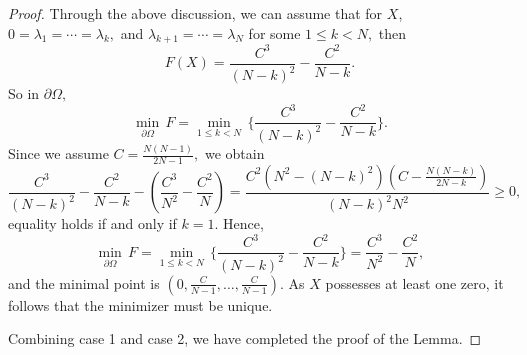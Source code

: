 \documentclass[10pt,a4paper]{amsart}
\begin{document}
\begin{proof}
		Through the above discussion, we can assume that for $X$, $0={\lambda }_1=\cdots ={\lambda }_k,$ and ${\lambda }_{k+1}=\cdots ={\lambda }_N$ for some $1\le k< N,$ then
		\[F(X)=\frac{C^3}{(N-k)^2}-\frac{C^2}{N-k}.\]
		So in $\partial \Omega,$
		$$\underset{\partial \Omega }{\mathop{\min }}\,F=\underset{1\le k< N}{\mathop{\min }}\,\{\frac{C^3}{(N-k)^2} -\frac{C^2}{N-k}\}.$$
		Since we assume $C=\frac{N(N-1)}{2N-1},$ we obtain 
		$$\frac{C^3}{(N-k)^2}-\frac{C^2}{N-k}-(\frac{C^3}{N^2}-\frac{C^2}{N})=\frac{{C^2}(N^2-(N-k)^2)(C-\frac{N(N-k)}{2N-k})}{(N-k)^2N^2}\ge 0,$$
		equality holds if and only if $k=1$. Hence,
		$$\underset{\partial \Omega }{\mathop{\min }}\,F=\underset{1\le k< N}{\mathop{\min }}\,\{\frac{C^3}{(N-k)^2}-\frac{C^2}{N-k}\}=\frac{C^3}{N^2}-\frac{C^2}{N},$$
		and the minimal point is $\left( 0,\frac{C}{N-1},\ldots ,\frac{C}{N-1} \right)$. As $X$ possesses at least one zero, it follows that the minimizer must be unique.
		
		Combining case 1 and case 2, we have completed the proof of the Lemma.
	\end{proof}
\end{document}
